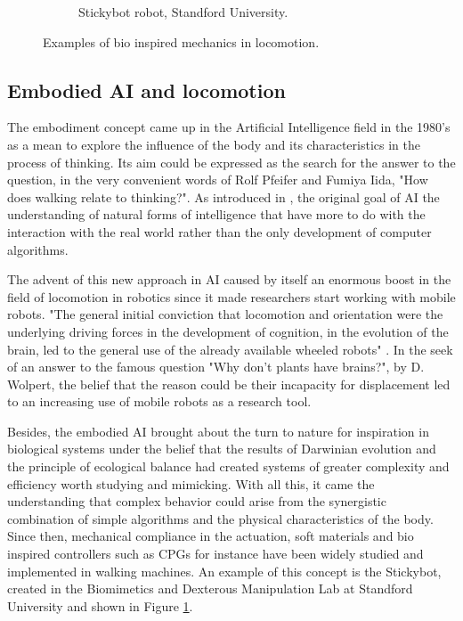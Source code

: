 \begin{figure}[htb]
\begin{subfigure}[b]{0.45\textwidth}
        \caption{Stickybot robot, Standford University.}
        \label{fig:stickybot}
    \end{subfigure}
\caption{Examples of bio inspired mechanics in locomotion.}
\label{fig:figure1}
\end{figure}

\subsection{Embodied AI and locomotion} %
\label{sub:the_embodiment_}
The embodiment concept came up in the Artificial Intelligence field in the 1980's as a mean to explore the influence of the body and its characteristics in the process of thinking. 
Its aim could be expressed as the search for the answer to the question, in the very convenient words of Rolf Pfeifer and Fumiya Iida, "How does walking relate to thinking?".
As introduced in \cite{pfeifer}, the original goal of AI the understanding of natural forms of intelligence that have more to do with the interaction with the real world rather than the only development of computer algorithms.

The advent of this new approach in AI caused by itself an enormous boost in the field of locomotion in robotics since it made researchers start working with mobile robots.
"The general initial conviction that locomotion and orientation were the underlying driving forces in the development of cognition, in the evolution of the brain, led to the general use of the already available wheeled robots" \cite{pfeifer}.
In the seek of an answer to the famous question "Why don’t plants have brains?", by D. Wolpert, the belief that the reason could be their incapacity for displacement led to an increasing use of mobile robots as a research tool.

Besides, the embodied AI brought about the turn to nature for inspiration in biological systems under the belief that the results of Darwinian evolution and the principle of ecological balance had created systems of greater complexity and efficiency worth studying and mimicking.
With all this, it came the understanding that complex behavior could arise from the synergistic combination of simple algorithms and the physical characteristics of the body.
Since then, mechanical compliance in the actuation, soft materials and bio inspired controllers such as CPGs for instance have been widely studied and implemented in walking machines. 
An example of this concept is the Stickybot, created in the Biomimetics and Dexterous Manipulation Lab at Standford University and shown in Figure \ref{fig:stickybot}.

